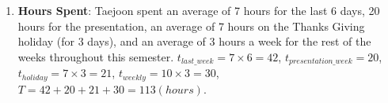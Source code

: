 \documentclass{article}
\begin{document}
\begin{enumerate}
\item
{\bf Hours Spent}: Taejoon spent an average of 7 hours for the last 6 days, 20 hours for the presentation, an average of 7 hours on the Thanks Giving holiday (for 3 days), and an average of 3 hours a week for the rest of the weeks throughout this semester.
$t_{\mathit{last\_week}} = 7 \times 6 = 42$,
$t_{\mathit{presentation\_week}} = 20$,
$t_{\mathit{holiday}} = 7 \times 3 = 21$,
$t_{\mathit{weekly}} = 10 \times 3 = 30$,
$T = 42 + 20 + 21 + 30 = 113 (hours)$.
\end{enumerate}
\end{document}
